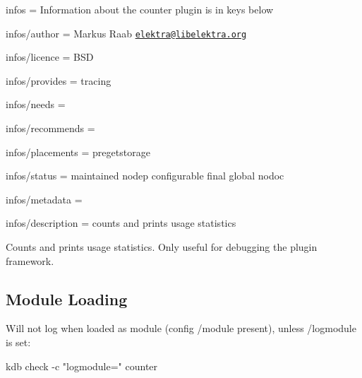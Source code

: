 
\begin{DoxyItemize}
\item infos = Information about the counter plugin is in keys below
\item infos/author = Markus Raab \href{mailto:elektra@libelektra.org}{\tt elektra@libelektra.\+org}
\item infos/licence = B\+SD
\item infos/provides = tracing
\item infos/needs =
\item infos/recommends =
\item infos/placements = pregetstorage
\item infos/status = maintained nodep configurable final global nodoc
\item infos/metadata =
\item infos/description = counts and prints usage statistics
\end{DoxyItemize}

Counts and prints usage statistics. Only useful for debugging the plugin framework.

\subsection*{Module Loading}

Will not log when loaded as module (config {\ttfamily /module} present), unless {\ttfamily /logmodule} is set\+: \begin{DoxyVerb}kdb check -c "logmodule=" counter\end{DoxyVerb}
 